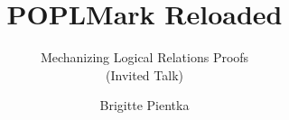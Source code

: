 \documentclass[sigplan,screen]{acmart}\settopmatter{}
\begin{document}
\title[POPLMark Reloaded]{POPLMark Reloaded}         %
 \subtitle{Mechanizing Logical Relations Proofs \\ (Invited Talk) }                     %



\author{Brigitte Pientka}
\end{document}
